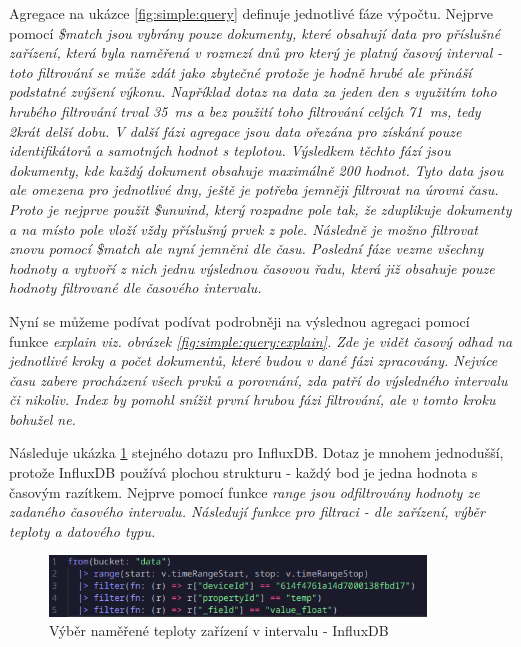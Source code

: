 \documentclass{article}
\begin{document}
Agregace na ukázce \ref{fig:simple:query} definuje jednotlivé fáze výpočtu. Nejprve pomocí \it{\$match} jsou vybrány pouze dokumenty, které obsahují data pro příslušné zařízení, která byla naměřená v rozmezí dnů pro který je platný časový interval - toto filtrování se může zdát jako zbytečné protože je hodně hrubé ale přináší podstatné zvýšení výkonu. Například dotaz na data za jeden den s využitím toho hrubého filtrování trval 35~ms a bez použití toho filtrování celých 71~ms, tedy 2krát delší dobu. V další fázi agregace jsou data ořezána pro získání pouze identifikátorů a samotných hodnot s teplotou. Výsledkem těchto fází jsou dokumenty, kde každý dokument obsahuje maximálně 200 hodnot. Tyto data jsou ale omezena pro jednotlivé dny, ještě je potřeba jemněji filtrovat na úrovni času. Proto je nejprve použit \it{\$unwind}, který rozpadne pole tak, že zduplikuje dokumenty a na místo pole vloží vždy příslušný prvek z pole. Následně je možno filtrovat znovu pomocí \it{\$match} ale nyní jemněni dle času. Poslední fáze vezme všechny hodnoty a vytvoří z nich jednu výslednou časovou řadu, která již obsahuje pouze hodnoty filtrované dle časového intervalu.

Nyní se můžeme podívat podívat podrobněji na výslednou agregaci pomocí funkce \it{explain} viz. obrázek \ref{fig:simple:query:explain}. Zde je vidět časový odhad na jednotlivé kroky a počet dokumentů, které budou v dané fázi zpracovány. Nejvíce času zabere procházení všech prvků a porovnání, zda patří do výsledného intervalu či nikoliv. Index by pomohl snížit první hrubou fázi filtrování, ale v tomto kroku bohužel ne.

Následuje ukázka \ref{influx:simple:query:explain} stejného dotazu pro InfluxDB. Dotaz je mnohem jednodušší, protože InfluxDB používá plochou strukturu - každý bod je jedna hodnota s časovým razítkem. Nejprve pomocí funkce \it{range} jsou odfiltrovány hodnoty ze zadaného časového intervalu. Následují funkce pro filtraci - dle zařízení, výběr teploty a datového typu.

\begin{figure}[htbp]
\includegraphics[width=10cm]{images/simple_query_24_infl.png}
\centering 
\caption{Výběr naměřené teploty zařízení v intervalu - InfluxDB \label{influx:simple:query:explain}} 
\end{figure} 
\end{document}
